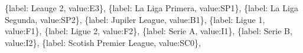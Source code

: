 \documentclass[
  letterpaper,
  DIV=11,
  numbers=noendperiod]{scrartcl}
\newenvironment{Shaded}{\begin{snugshade}}{\end{snugshade}}
\newcommand{\NormalTok}[1]{\textcolor[rgb]{0.00,0.23,0.31}{#1}}
\newcommand{\StringTok}[1]{\textcolor[rgb]{0.13,0.47,0.30}{#1}}
\begin{document}
\begin{Shaded}
\begin{Highlighting}[]
\NormalTok{                \{}\StringTok{\textquotesingle{}label\textquotesingle{}}\NormalTok{: }\StringTok{\textquotesingle{}Leauge 2\textquotesingle{}}\NormalTok{, }\StringTok{\textquotesingle{}value\textquotesingle{}}\NormalTok{:}\StringTok{\textquotesingle{}E3\textquotesingle{}}\NormalTok{\},}
\NormalTok{                \{}\StringTok{\textquotesingle{}label\textquotesingle{}}\NormalTok{: }\StringTok{\textquotesingle{}La Liga Primera\textquotesingle{}}\NormalTok{, }\StringTok{\textquotesingle{}value\textquotesingle{}}\NormalTok{:}\StringTok{\textquotesingle{}SP1\textquotesingle{}}\NormalTok{\},}
\NormalTok{                \{}\StringTok{\textquotesingle{}label\textquotesingle{}}\NormalTok{: }\StringTok{\textquotesingle{}La Liga Segunda\textquotesingle{}}\NormalTok{, }\StringTok{\textquotesingle{}value\textquotesingle{}}\NormalTok{:}\StringTok{\textquotesingle{}SP2\textquotesingle{}}\NormalTok{\},}
\NormalTok{                \{}\StringTok{\textquotesingle{}label\textquotesingle{}}\NormalTok{: }\StringTok{\textquotesingle{}Jupiler League\textquotesingle{}}\NormalTok{, }\StringTok{\textquotesingle{}value\textquotesingle{}}\NormalTok{:}\StringTok{\textquotesingle{}B1\textquotesingle{}}\NormalTok{\},}
\NormalTok{                \{}\StringTok{\textquotesingle{}label\textquotesingle{}}\NormalTok{: }\StringTok{\textquotesingle{}Ligue 1\textquotesingle{}}\NormalTok{, }\StringTok{\textquotesingle{}value\textquotesingle{}}\NormalTok{:}\StringTok{\textquotesingle{}F1\textquotesingle{}}\NormalTok{\},}
\NormalTok{                \{}\StringTok{\textquotesingle{}label\textquotesingle{}}\NormalTok{: }\StringTok{\textquotesingle{}Ligue 2\textquotesingle{}}\NormalTok{, }\StringTok{\textquotesingle{}value\textquotesingle{}}\NormalTok{:}\StringTok{\textquotesingle{}F2\textquotesingle{}}\NormalTok{\},}
\NormalTok{                \{}\StringTok{\textquotesingle{}label\textquotesingle{}}\NormalTok{: }\StringTok{\textquotesingle{}Serie A\textquotesingle{}}\NormalTok{, }\StringTok{\textquotesingle{}value\textquotesingle{}}\NormalTok{:}\StringTok{\textquotesingle{}I1\textquotesingle{}}\NormalTok{\},}
\NormalTok{                \{}\StringTok{\textquotesingle{}label\textquotesingle{}}\NormalTok{: }\StringTok{\textquotesingle{}Serie B\textquotesingle{}}\NormalTok{, }\StringTok{\textquotesingle{}value\textquotesingle{}}\NormalTok{:}\StringTok{\textquotesingle{}I2\textquotesingle{}}\NormalTok{\},}
\NormalTok{                \{}\StringTok{\textquotesingle{}label\textquotesingle{}}\NormalTok{: }\StringTok{\textquotesingle{}Scotish Premier League\textquotesingle{}}\NormalTok{, }\StringTok{\textquotesingle{}value\textquotesingle{}}\NormalTok{:}\StringTok{\textquotesingle{}SC0\textquotesingle{}}\NormalTok{\},}

\end{Highlighting}
\end{Shaded}
\end{document}
